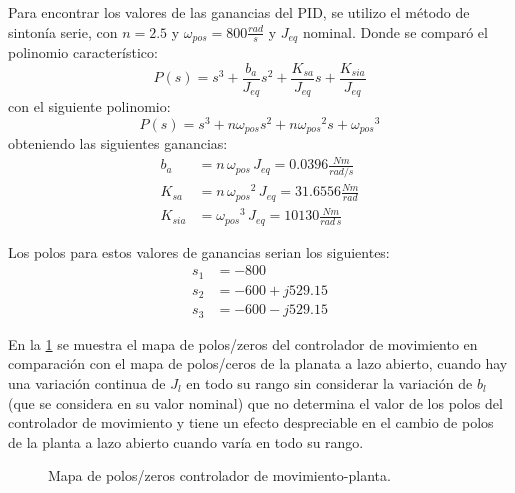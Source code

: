 \documentclass[a4paper, 10pt, onecolumn,journal]{ieeeconf}
\begin{document}
Para encontrar los valores de las ganancias del PID, se utilizo el método de sintonía serie, con $n=2.5$ y $\omega_{pos}=800\frac{rad}{s}$ y $J_{eq}$ nominal. Donde se comparó el polinomio característico:
\begin{equation}
	P(s) =  s^3 + \frac{b_a}{J_{eq}} s^2 + \frac{K_{sa}}{J_{eq}} s + \frac{K_{sia}}{J_{eq}} 
\end{equation}
con el siguiente polinomio:
\begin{equation}
	P(s) =  s^3 + n \omega_{pos} s^2 + n {\omega_{pos}}^2 s + {\omega_{pos}}^3 
\end{equation}
obteniendo las siguientes ganancias:
\begin{align}
	b_a &=  n \, \omega_{pos} \, J_{eq}= 0.0396 \frac{Nm}{rad/s} \\
	K_{sa} &=  n \, {\omega_{pos}}^2 \, J_{eq}= 31.6556 \frac{Nm}{rad}\\
	K_{sia} &= {\omega_{pos}}^3 \, J_{eq}= 10130 \frac{Nm}{rad \, s}
\end{align}

Los polos para estos valores de ganancias serian los siguientes:
\begin{align}
	s_1 &= -800 \\
	s_2 &=  -600 + j 529.15\\
	s_3 &=  -600 - j 529.15
\end{align}

En la \cref{mapa de polos-ceros controlador-planta} se muestra el mapa de polos/zeros del controlador de movimiento
en comparación con el mapa de polos/ceros de la planata a lazo abierto, cuando hay una variación continua de $J_l$ en todo su rango
sin considerar la variación de $b_l$ (que se considera en su valor nominal) que no determina el valor de los polos del controlador de movimiento y tiene un 
efecto despreciable en el cambio de polos de la planta a lazo abierto cuando varía en todo su rango.

\begin{figure}[htpb]
	\centering
	\begin{adjustbox}{max width=\columnwidth}
	\end{adjustbox}
	\caption{Mapa de polos/zeros controlador de movimiento-planta.}
	\label{mapa de polos-ceros controlador-planta}
\end{figure}
\end{document}
